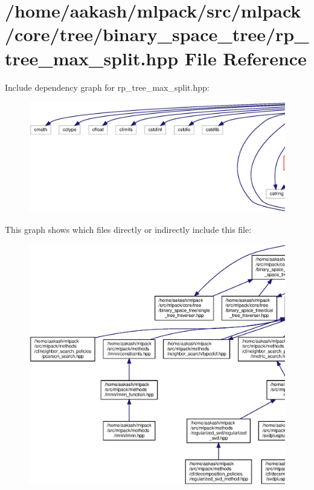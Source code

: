 \section{/home/aakash/mlpack/src/mlpack/core/tree/binary\+\_\+space\+\_\+tree/rp\+\_\+tree\+\_\+max\+\_\+split.hpp File Reference}
\label{rp__tree__max__split_8hpp}
Include dependency graph for rp\+\_\+tree\+\_\+max\+\_\+split.\+hpp\+:
\nopagebreak
\begin{figure}[H]
\begin{center}
\leavevmode
\includegraphics[width=350pt]{rp__tree__max__split_8hpp__incl}
\end{center}
\end{figure}
This graph shows which files directly or indirectly include this file\+:
\nopagebreak
\begin{figure}[H]
\begin{center}
\leavevmode
\includegraphics[width=350pt]{rp__tree__max__split_8hpp__dep__incl}
\end{center}
\end{figure}

